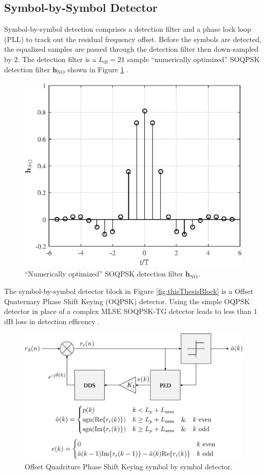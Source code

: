 \subsection{Symbol-by-Symbol Detector}
\label{sec:oqpsk_detector}
Symbol-by-symbol detection comprises a detection filter and a phase lock loop (PLL) to track out the residual frequency offset.
Before the symbols are detected, the equalized samples are passed through the detection filter then down-sampled by $2$. 
The detection filter is a $L_\text{df} = 21$ sample ``numerically optimized'' SOQPSK detection filter $\mathbf{h}_\text{NO}$ shown in Figure \ref{fig:detectionFilter}
\cite[Fig. 3]{perrins:2013}.
\begin{figure}
	\centering\includegraphics[width=5in]{figures/eq_equations/df.eps}
	\caption{``Numerically optimized'' SOQPSK detection filter $\mathbf{h}_\text{NO}$.}
	\label{fig:detectionFilter}
\end{figure}
The symbol-by-symbol detector block in Figure \ref{fig:thisThesisBlock} is a Offset Quaternary Phase Shift Keying (OQPSK) detector.
Using the simple OQPSK detector in place of a complex MLSE SOQPSK-TG detector leads to less than $1$ dB loss in detection efficency \cite{perrins:2013}.
\begin{figure}
	\centering\includegraphics[width=9.11in/100*55]{figures/systemOverview/OQPSK.pdf}
	\caption{Offset Quadriture Phase Shift Keying symbol by symbol detector.}
	\label{fig:OQPSK}
\end{figure}

